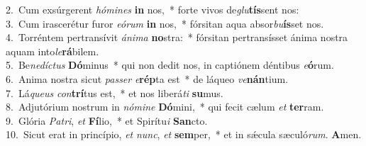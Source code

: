 {2.~}Cum exsúrgerent \textit{hó}\textit{mi}\textit{nes} \textbf{in} nos,~* forte vivos de\textit{glu}\textbf{tís}sent nos:\\
{3.~}Cum irascerétur furor \textit{e}\textit{ó}\textit{rum} \textbf{in} nos,~* fórsitan aqua absor\textit{bu}\textbf{ís}set nos.\\
{4.~}Torréntem pertransívit \textit{á}\textit{ni}\textit{ma} \textbf{no}stra:~* fórsitan pertransísset ánima nostra aquam into\textit{le}\textbf{rá}bilem.\\
{5.~}Be\textit{ne}\textit{dí}\textit{ctus} \textbf{Dó}minus~* qui non dedit nos, in captiónem déntibus \textit{e}\textbf{ó}rum.\\
{6.~}Anima nostra sicut \textit{pas}\textit{ser} \textit{e}\textbf{rép}ta est~* de láqueo \textit{ve}\textbf{nán}tium.\\
{7.~}Lá\textit{que}\textit{us} \textit{con}\textbf{trí}tus est,~* et nos liberá\textit{ti} \textbf{su}mus.\\
{8.~}Adjutórium nostrum in \textit{nó}\textit{mi}\textit{ne} \textbf{Dó}mini,~* qui fecit cælum \textit{et} \textbf{ter}ram.\\
{9.~}Glória \textit{Pa}\textit{tri}, \textit{et} \textbf{Fí}lio,~* et Spirítu\textit{i} \textbf{San}cto.\\
{10.~}Sicut erat in princípio, \textit{et} \textit{nunc}, \textit{et} \textbf{sem}per,~* et in sǽcula sæculó\textit{rum}. \textbf{A}men.\\
